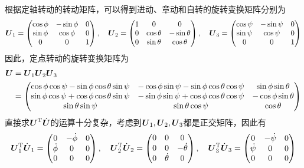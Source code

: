 根据定轴转动的转动矩阵，可以得到进动、章动和自转的旋转变换矩阵分别为
\begin{equation*}
	\boldsymbol{U}_1 = \begin{pmatrix} \cos \phi & -\sin \phi & 0 \\ \sin \phi & \cos \phi & 0 \\ 0 & 0 & 1 \end{pmatrix},\quad \boldsymbol{U}_2 = \begin{pmatrix} 1 & 0 & 0 \\ 0 & \cos \theta & -\sin \theta \\ 0 & \sin \theta & \cos \theta \end{pmatrix},\quad \boldsymbol{U}_3 = \begin{pmatrix} \cos \psi & -\sin \psi & 0 \\ \sin \psi & \cos \psi & 0 \\ 0 & 0 & 1 \end{pmatrix}
\end{equation*}
因此，定点转动的旋转变换矩阵为
\begin{align*}
	\boldsymbol{U} & = \boldsymbol{U}_1 \boldsymbol{U}_2 \boldsymbol{U}_3 \\
	& = \begin{pmatrix}
		\cos \phi \cos \psi - \sin \phi \cos \theta \sin \psi & -\cos \phi \sin \psi - \sin \phi \cos \theta \cos \psi & \sin \phi \sin \theta \\
		\sin \phi \cos \psi + \cos \phi \cos \theta \sin \psi & -\sin \phi \sin \psi + \cos \phi \cos \theta \cos \psi & -\cos \phi \sin \theta \\
		\sin \theta \sin \psi & \sin \theta \cos \psi & \cos \theta
	\end{pmatrix}
\end{align*}
直接求$\boldsymbol{U}^{\mathrm{T}} \dot{\boldsymbol{U}}$的运算十分复杂，考虑到$\boldsymbol{U}_1,\boldsymbol{U}_2,\boldsymbol{U}_3$都是正交矩阵，因此有
\begin{equation*}
	\boldsymbol{U}_1^{\mathrm{T}} \dot{\boldsymbol{U}}_1 = \begin{pmatrix} 0 & -\dot{\phi} & 0 \\ \dot{\phi} & 0 & 0 \\ 0 & 0 & 0 \end{pmatrix},\quad \boldsymbol{U}_2^{\mathrm{T}} \dot{\boldsymbol{U}}_2 = \begin{pmatrix} 0 & 0 & 0 \\ 0 & 0 & -\dot{\theta} \\ 0 & \dot{\theta} & 0 \end{pmatrix},\quad \boldsymbol{U}_3^{\mathrm{T}} \dot{\boldsymbol{U}}_3 = \begin{pmatrix} 0 & -\dot{\psi} & 0 \\ \dot{\psi} & 0 & 0 \\ 0 & 0 & 0 \end{pmatrix}
\end{equation*}
